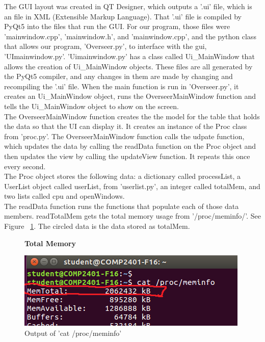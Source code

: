 \documentclass[12pt]{article}
\begin{document}
The GUI layout was created in QT Designer, which outputs a '.ui' file, which is an file in XML (Extensible Markup Language).
That '.ui' file is compiled by PyQt5 into the files that run the GUI.
For our program, those files were 'mainwindow.cpp', 'mainwindow.h', and 'mainwindow.cpp', and the python class that allows our program, 'Overseer.py', to interface with the gui, 'UImainwindow.py'.
'Uimainwindow.py' has a class called Ui\_MainWindow that allows the creation of Ui\_MainWindow objects.
These files are all generated by the PyQt5 compiler, and any changes in them are made by changing and recompiling the '.ui' file.
When the main function is run in 'Overseer.py', it creates an Ui\_MainWindow object, runs the OverseerMainWindow function and tells the Ui\_MainWindow object to show on the screen.\\
The OverseerMainWindow function creates the the model for the table that holds the data so that the UI can display it.
It creates an instance of the Proc class from 'proc.py'.
The OverseerMainWindow function calls the udpate function, which updates the data by calling the readData function on the Proc object and then updates the view by calling the updateView function.
It repeats this once every second.\\
The Proc object stores the following data: a dictionary called processList, a UserList object called userList, from 'userlist.py', an integer called totalMem, and two lists called cpu and openWindows.\\
The readData function runs the functions that populate each of those data members.
readTotalMem gets the total memory usage from '/proc/meminfo/'.
See Figure ~\ref{figTotalMem}.
The circled data is the data stored as totalMem.
\begin{figure}[here]
	\centering
	\textbf{Total Memory}\par\medskip
	\includegraphics{totalMem}
	\caption{Output of 'cat /proc/meminfo'}
	\label{figTotalMem}
\end{figure}
\end{document}
